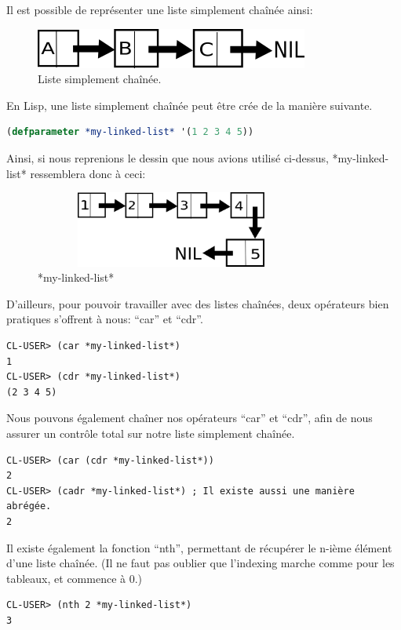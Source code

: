 \documentclass[a4paper, 12pt]{article}
\numberwithin{equation}{subsection}
\begin{document}
Il est possible de représenter une liste simplement chaînée ainsi: \\
\begin{figure}[H]
  \centering
  \includegraphics[width=9.0cm]{imgs/linked_list.png}
  \caption{Liste simplement chaînée.}
\end{figure}
En Lisp, une liste simplement chaînée peut être crée de la manière suivante. \\
\begin{lstlisting}[language=Lisp]
(defparameter *my-linked-list* '(1 2 3 4 5))
\end{lstlisting}
Ainsi, si nous reprenions le dessin que nous avions utilisé ci-dessus,
*my-linked-list* ressemblera donc à ceci: \\
\begin{figure}[H]
  \centering
  \includegraphics[width=9.0cm, height=2.5cm]{imgs/my_linked_list.png}
  \caption{*my-linked-list*}
\end{figure}
D'ailleurs, pour pouvoir travailler avec des listes chaînées, deux opérateurs bien pratiques s'offrent à nous: ``car'' et ``cdr''. \\[0.2cm]
\begin{lstlisting}[language=LISP]
CL-USER> (car *my-linked-list*)
1
CL-USER> (cdr *my-linked-list*)
(2 3 4 5)
\end{lstlisting}
Nous pouvons également chaîner nos opérateurs ``car'' et ``cdr'', afin de nous assurer un contrôle total sur notre liste simplement chaînée.
\begin{lstlisting}[language=LISP]
CL-USER> (car (cdr *my-linked-list*))
2
CL-USER> (cadr *my-linked-list*) ; Il existe aussi une manière abrégée.
2
\end{lstlisting}
Il existe également la fonction ``nth'', permettant de récupérer le n-ième élément d'une liste chaînée. (Il ne faut pas oublier que l'indexing marche comme pour les tableaux, et commence à 0.)
\begin{lstlisting}[language=LISP]
CL-USER> (nth 2 *my-linked-list*)
3
\end{lstlisting}
\end{document}
